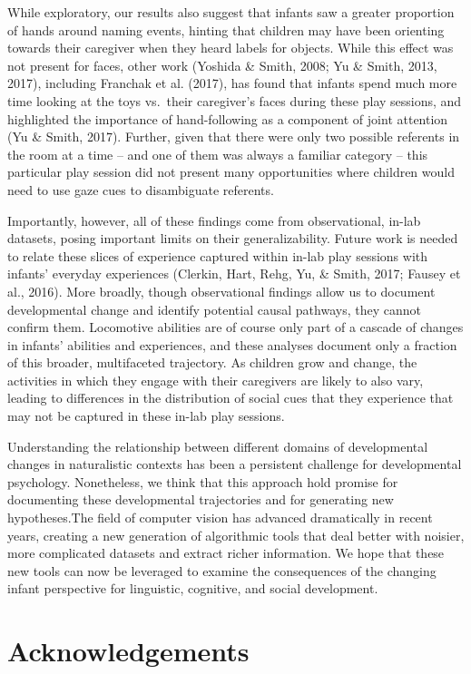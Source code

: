 \documentclass[english,man]{apa6}
\begin{document}
While exploratory, our results also suggest that infants saw a greater
proportion of hands around naming events, hinting that children may have
been orienting towards their caregiver when they heard labels for
objects. While this effect was not present for faces, other work
(Yoshida \& Smith, 2008; Yu \& Smith, 2013, 2017), including Franchak et
al. (2017), has found that infants spend much more time looking at the
toys vs.~their caregiver's faces during these play sessions, and
highlighted the importance of hand-following as a component of joint
attention (Yu \& Smith, 2017). Further, given that there were only two
possible referents in the room at a time -- and one of them was always a
familiar category -- this particular play session did not present many
opportunities where children would need to use gaze cues to disambiguate
referents.

Importantly, however, all of these findings come from observational,
in-lab datasets, posing important limits on their generalizability.
Future work is needed to relate these slices of experience captured
within in-lab play sessions with infants' everyday experiences (Clerkin,
Hart, Rehg, Yu, \& Smith, 2017; Fausey et al., 2016). More broadly,
though observational findings allow us to document developmental change
and identify potential causal pathways, they cannot confirm them.
Locomotive abilities are of course only part of a cascade of changes in
infants' abilities and experiences, and these analyses document only a
fraction of this broader, multifaceted trajectory. As children grow and
change, the activities in which they engage with their caregivers are
likely to also vary, leading to differences in the distribution of
social cues that they experience that may not be captured in these
in-lab play sessions.

Understanding the relationship between different domains of
developmental changes in naturalistic contexts has been a persistent
challenge for developmental psychology. Nonetheless, we think that this
approach hold promise for documenting these developmental trajectories
and for generating new hypotheses.The field of computer vision has
advanced dramatically in recent years, creating a new generation of
algorithmic tools that deal better with noisier, more complicated
datasets and extract richer information. We hope that these new tools
can now be leveraged to examine the consequences of the changing infant
perspective for linguistic, cognitive, and social development.

\section{Acknowledgements}\label{acknowledgements}
\end{document}

